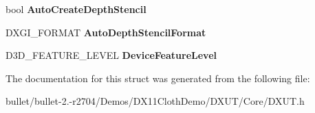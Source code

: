 \begin{DoxyCompactItemize}
\item 
\hypertarget{struct_d_x_u_t_d3_d11_device_settings_a17dc21c5c91382d810a85ba2fa98eb0e}{bool {\bfseries Auto\+Create\+Depth\+Stencil}}\label{struct_d_x_u_t_d3_d11_device_settings_a17dc21c5c91382d810a85ba2fa98eb0e}

\item 
\hypertarget{struct_d_x_u_t_d3_d11_device_settings_a04311afb1857195d6b30cdd5dba3ce58}{D\+X\+G\+I\+\_\+\+F\+O\+R\+M\+A\+T {\bfseries Auto\+Depth\+Stencil\+Format}}\label{struct_d_x_u_t_d3_d11_device_settings_a04311afb1857195d6b30cdd5dba3ce58}

\item 
\hypertarget{struct_d_x_u_t_d3_d11_device_settings_ab3aa9f61a1f91bcb0fa30d27f674e4b5}{D3\+D\+\_\+\+F\+E\+A\+T\+U\+R\+E\+\_\+\+L\+E\+V\+E\+L {\bfseries Device\+Feature\+Level}}\label{struct_d_x_u_t_d3_d11_device_settings_ab3aa9f61a1f91bcb0fa30d27f674e4b5}

\end{DoxyCompactItemize}


The documentation for this struct was generated from the following file\+:\begin{DoxyCompactItemize}
\item 
bullet/bullet-\/2.-\/r2704/\+Demos/\+D\+X11\+Cloth\+Demo/\+D\+X\+U\+T/\+Core/D\+X\+U\+T.\+h\end{DoxyCompactItemize}
